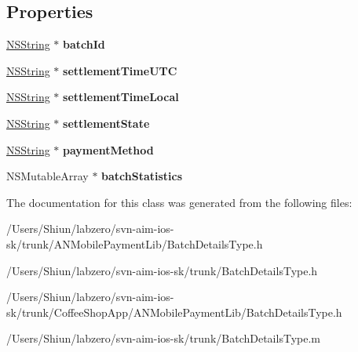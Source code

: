 \subsection*{Properties}
\begin{DoxyCompactItemize}
\item 
\hypertarget{interface_batch_details_type_a1a837fd7ba10ad4e068fa7bc1c75ec96}{
\hyperlink{class_n_s_string}{NSString} $\ast$ {\bfseries batchId}}
\label{interface_batch_details_type_a1a837fd7ba10ad4e068fa7bc1c75ec96}

\item 
\hypertarget{interface_batch_details_type_a4d11c6ced5f9a58105badf5329cf9c46}{
\hyperlink{class_n_s_string}{NSString} $\ast$ {\bfseries settlementTimeUTC}}
\label{interface_batch_details_type_a4d11c6ced5f9a58105badf5329cf9c46}

\item 
\hypertarget{interface_batch_details_type_afcade554bca27754d5ad4f8b9c908e78}{
\hyperlink{class_n_s_string}{NSString} $\ast$ {\bfseries settlementTimeLocal}}
\label{interface_batch_details_type_afcade554bca27754d5ad4f8b9c908e78}

\item 
\hypertarget{interface_batch_details_type_a9d55ae60fcdfff6efb1d3f3f27e7fa53}{
\hyperlink{class_n_s_string}{NSString} $\ast$ {\bfseries settlementState}}
\label{interface_batch_details_type_a9d55ae60fcdfff6efb1d3f3f27e7fa53}

\item 
\hypertarget{interface_batch_details_type_aeba920c5ccf9286ba94a555dd8168586}{
\hyperlink{class_n_s_string}{NSString} $\ast$ {\bfseries paymentMethod}}
\label{interface_batch_details_type_aeba920c5ccf9286ba94a555dd8168586}

\item 
\hypertarget{interface_batch_details_type_a7aa20d737ba9ee3debe2e3b7c9313981}{
NSMutableArray $\ast$ {\bfseries batchStatistics}}
\label{interface_batch_details_type_a7aa20d737ba9ee3debe2e3b7c9313981}

\end{DoxyCompactItemize}


The documentation for this class was generated from the following files:\begin{DoxyCompactItemize}
\item 
/Users/Shiun/labzero/svn-\/aim-\/ios-\/sk/trunk/ANMobilePaymentLib/BatchDetailsType.h\item 
/Users/Shiun/labzero/svn-\/aim-\/ios-\/sk/trunk/BatchDetailsType.h\item 
/Users/Shiun/labzero/svn-\/aim-\/ios-\/sk/trunk/CoffeeShopApp/ANMobilePaymentLib/BatchDetailsType.h\item 
/Users/Shiun/labzero/svn-\/aim-\/ios-\/sk/trunk/BatchDetailsType.m\end{DoxyCompactItemize}
